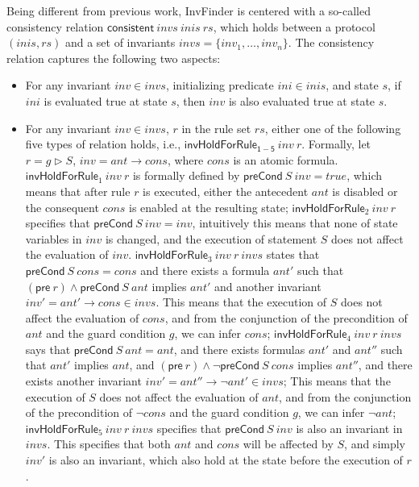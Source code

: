 \documentclass{llncs}
\begin{document}
Being different from previous work, {\sf InvFinder} is centered with
a so-called consistency relation $\mathsf{consistent}~ invs ~inis~
rs$,
 which holds between a protocol $(inis,rs)$ and
a set of invariants $invs=\{inv_1,\ldots, inv_n\}$.
The consistency relation captures the following two aspects:
%
\begin{itemize}
\item For any invariant $inv \in invs$,
initializing predicate $ini \in inis$, and
state $s$, if $ini$ is evaluated true at state $s$, then $inv$ is
also evaluated true at state $s$.

\item For any invariant $inv \in invs$, $r$ in the rule set
$rs$, either one of the following five types of relation holds,
i.e., $\mathsf{invHoldForRule_{1-5}}~inv~ r$.
%
%
Formally, let $r=g \vartriangleright  S$, $inv=ant \longrightarrow
cons$, where $cons$ is an atomic formula.
$\mathsf{invHoldForRule}_1~inv~ r$ is formally defined by
 $\mathsf{preCond}~S~inv=true$, which means that after rule $r$ is executed,
either the antecedent $ant$ is disabled or the consequent $cons$ is
enabled at the resulting state;
 $\mathsf{invHoldForRule}_2~inv~ r$ specifies that
 $\mathsf{preCond}~S~inv=inv$, intuitively this means that none of state variables in $inv$ is
 changed, and the execution of statement $S$ does not affect the
 evaluation of $inv$.
 $\mathsf{invHoldForRule}_3~inv~ r~invs$ states
  that $\mathsf{preCond}~S~cons=cons$ and there exists a formula $ant'$ such that
$(\mathsf{pre}~r )\wedge \mathsf{preCond}~S~ant$ implies $ant'$ and
another invariant $inv'=ant' \longrightarrow cons \in invs$. This
means that the execution of $S$ does not affect the evaluation of
$cons$, and from the conjunction of the precondition of $ant$ and
the guard condition $g$, we can infer $cons$;
 $\mathsf{invHoldForRule}_4~inv~ r~invs$ says
  that $\mathsf{preCond}~S~ant=ant$, and there exists formulas
  $ant'$ and $ant''$
such that  $ant'$ implies $ant$, and $(\mathsf{pre}~r )\wedge \neg
\mathsf{preCond}~S~cons$ implies  $ant''$, and there exists another
invariant $inv'=ant'' \longrightarrow \neg ant' \in invs$;
 This means that the execution of $S$ does not affect the evaluation of
$ant$, and from the conjunction of the precondition of $\neg cons$
and the guard condition $g$, we can infer $\neg ant$;
$\mathsf{invHoldForRule}_5~inv~ r~invs$ specifies that
$\mathsf{preCond}~S~inv$ is also an invariant in  $invs$. This
specifies that both $ant$ and $cons$ will be affected by $S$, and
simply $inv'$ is also an invariant, which also hold at the state
before the execution of $r$.
\end{itemize}
\end{document}
